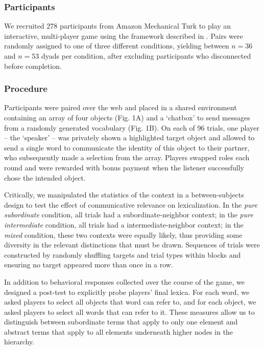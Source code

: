 \documentclass[10pt,letterpaper]{article}
\begin{document}
\subsubsection{Participants}

We recruited 278 participants from Amazon Mechanical Turk to play an interactive, multi-player game using the framework described in . Pairs were randomly assigned to one of three different conditions, yielding between $n=36$ and $n=53$ dyads per condition, after excluding participants who disconnected before completion.

\subsubsection{Procedure}
Participants were paired over the web and placed in a shared environment containing an array of four objects (Fig. 1A) and a `chatbox' to send messages from a randomly generated vocabulary (Fig. 1B). On each of 96 trials, one player -- the `speaker' -- was privately shown a highlighted target object and allowed to send a single word to communicate the identity of this object to their partner, who subsequently made a selection from the array. Players swapped roles each round and were rewarded with bonus payment when the listener successfully chose the intended object.

Critically, we manipulated the statistics of the context in a between-subjects design to test the effect of communicative relevance on lexicalization. In the \emph{pure subordinate} condition, all trials had a subordinate-neighbor context; in the \emph{pure intermediate} condition, all trials had a intermediate-neighbor context; in the \emph{mixed} condition, these two contexts were equally likely, thus providing some diversity in the relevant distinctions that must be drawn. Sequences of trials were constructed by randomly shuffling targets and trial types within blocks and ensuring no target appeared more than once in a row.

In addition to behavioral responses collected over the course of the game, we designed a post-test to explicitly probe players' final lexica. For each word, we asked players to select all objects that word can refer to, and for each object, we asked players to select all words that can refer to it. These measures allow us to distinguish between subordinate terms that apply to only one element and abstract terms that apply to all elements underneath higher nodes in the hierarchy.
\end{document}
